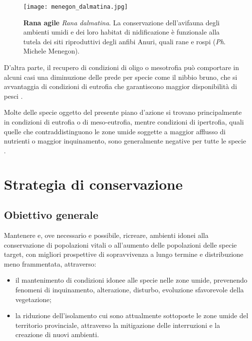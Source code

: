 \documentclass[10pt,twoside,openany,x11names,svgnames,italian,a5paper,dvipsnames,table]{memoir}
\newcommand\chapterillustration{}
\newcommand{\ph}{\emph{Ph}. }
\begin{document}
\begin{wrapfigure}[16]{l}{.6\textwidth}
\begin{center}
\vspace{-.7cm}
\texttt{[image: menegon\_dalmatina.jpg]}
\caption*{\textbf{Rana agile} \emph{Rana dalmatina}. La conservazione dell’avifauna degli ambienti umidi e dei loro habitat di nidificazione è funzionale alla tutela dei siti riproduttivi degli anfibi Anuri, quali rane e rospi (\ph Michele Menegon).}
\end{center}
\end{wrapfigure}
D'altra parte, il recupero di condizioni di oligo o mesotrofia può comportare in alcuni casi una diminuzione delle prede per specie come il nibbio bruno, che si avvantaggia di condizioni di eutrofia che garantiscono maggior disponibilità di pesci \cite{Sergio03b}.

Molte delle specie oggetto del presente piano d'azione si trovano principalmente in condizioni di eutrofia o di meso-eutrofia, mentre condizioni di ipertrofia, quali quelle che contraddistinguono le zone umide soggette a maggior afflusso di nutrienti o maggior inquinamento, sono generalmente negative per tutte le specie \cite{Brichetti03} \cite{Pedrini05} \cite{Gustin09} \cite{Gustin10}.




  
\setlength\afterchapskip{52mm}
\chapter{Strategia di conservazione}
\renewcommand\chapterillustration{2.jpg}


\section{Obiettivo generale} 
Mantenere e, ove necessario e possibile, ricreare, ambienti idonei alla conservazione di popolazioni vitali o all'aumento delle popolazioni delle specie target, con migliori prospettive di sopravvivenza a lungo termine e distribuzione meno frammentata, attraverso:
\begin{itemize}\itemsep0pt
\item il mantenimento di condizioni idonee alle specie nelle zone umide, prevenendo fenomeni di inquinamento, alterazione, disturbo, evoluzione sfavorevole della vegetazione;
\item la riduzione dell'isolamento cui sono attualmente sottoposte le zone umide del territorio provinciale, attraverso la mitigazione delle interruzioni e la creazione di nuovi ambienti.
\end{itemize}
\end{document}
